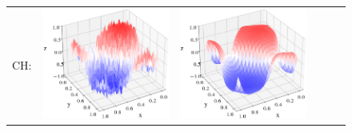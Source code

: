 \documentclass[12pt, reqno]{report}
\theoremstyle{definition}
\theoremstyle{remark}
\begin{document}
\begin{figure}[H]
\begin{tabular}{rccccc}
        CH: &
        \includegraphics[align = c, height=\subheight]{media_paper/CH_surf_FD_n=0.png} &
        \includegraphics[align = c, height=\subheight]{media_paper/CH_surf_FD_n=50.png} &

\end{tabular}
\end{figure}
\end{document}
